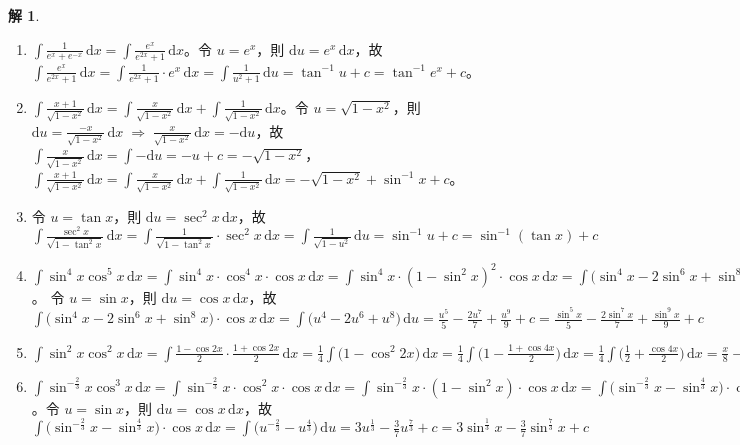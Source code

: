 \documentclass[12pt]{extarticle}
\newcommand{\ds}{\displaystyle}
\newcommand{\ie}{\;\Longrightarrow\;}
\theoremstyle{definition}
\newtheorem*{sol}{解}
\begin{document}
\begin{sol}
\begin{enumerate}
    \item $\ds\int\!\frac{1}{e^x + e^{-x}}\,\mathrm{d}x = \int\!\frac{e^x}{e^{2x} + 1}\,\text{d}x$。令 $\ds u = e^x$，則 $\ds\text{d}u = e^x\,\text{d}x$，故 $\ds\int\!\frac{e^x}{e^{2x} + 1}\,\text{d}x = \int\!\frac{1}{e^{2x} + 1}\cdot e^x\,\text{d}x = \int\!\frac{1}{u^2 + 1}\,\text{d}u = \tan^{-1}u + c = \tan^{-1}{e^{x}} + c$。
    \item $\ds\int\!\frac{x + 1}{\sqrt{1 - x^2}}\,\text{d}x = \int\!\frac{x}{\sqrt{1 - x^2}}\,\text{d}x + \int\!\frac{1}{\sqrt{1 - x^2}}\,\text{d}x$。令 $\ds u = \sqrt{1 - x^2}$，則 $\ds\text{d}u = \frac{-x}{\sqrt{1 - x^2}}\,\text{d}x\ie \frac{x}{\sqrt{1 - x^2}}\,\text{d}x = -\text{d}u$，故 $\ds\int\!\frac{x}{\sqrt{1 - x^2}}\,\text{d}x = \int-\text{d}u = -u + c = -\sqrt{1 - x^2}$，$\ds\int\!\frac{x + 1}{\sqrt{1 - x^2}}\,\text{d}x = \int\!\frac{x}{\sqrt{1 - x^2}}\,\text{d}x + \int\!\frac{1}{\sqrt{1 - x^2}}\,\text{d}x = -\sqrt{1 - x^2} + \sin^{-1}x + c$。
    \item 令 $\ds u = \tan x$，則 $\ds\text{d}u = \sec^2 x\,\text{d}x$，故 $\ds\int\!\frac{\sec^2 x}{\sqrt{1 - \tan^2 x}}\,\mathrm{d}x = \int\!\frac{1}{\sqrt{1 - \tan^2 x}}\cdot \sec^2 x\,\text{d}x = \int\!\frac{1}{\sqrt{1 - u^2}}\,\text{d}u = \sin^{-1} u + c = \sin^{-1}(\tan{x}) + c $
    \item $\ds\int\!\sin^4 x\cos^5 x\,\mathrm{d}x = \int\!\sin^4 x\cdot\cos^4 x\cdot\cos x\,\text{d}x = \int\!\sin^4x\cdot(1 - \sin^2 x)^2\cdot\cos x\,\text{d}x = \int\!\big(\sin^4x  - 2\sin^6x + \sin^8x\big)\cdot\cos x\,\text{d}x$。 令 $\ds u = \sin x$，則 $\ds\text{d}u = \cos x\,\text{d}x$，故 $\ds\int\!\big(\sin^4x  - 2\sin^6x + \sin^8x\big)\cdot\cos x\,\text{d}x = \int\!\big(u^4 - 2u^6 + u^8\big)\,\text{d}u = \frac{u^5}{5} - \frac{2u^7}{7} + \frac{u^9}{9} + c = \frac{\sin^5 x}{5} - \frac{2\sin^7 x}{7} + \frac{\sin^9 x}{9} + c$
    \item $\ds\int\!\sin^2 x\cos^2 x\,\mathrm{d}x = \int\!\frac{1 - \cos 2x}{2}\cdot\frac{1 + \cos 2x}{2}\,\text{d}x = \frac{1}{4}\int\!\big(1 - \cos^2{2x}\big)\,\text{d}x = \frac{1}{4}\int\!\big(1 - \frac{1 + \cos 4x}{2}\big)\,\text{d}x = \frac{1}{4}\int\!\big(\frac{1}{2} + \frac{\cos 4x}{2}\big)\,\text{d}x = \frac{x}{8} - \frac{\sin 4x}{32} + c$
    \item $\ds\int\!\sin^{-\frac{2}{3}} x\cos^3 x\,\mathrm{d}x = \int\!\sin^{-\frac{2}{3}} x\cdot\cos^2 x\cdot\cos x\,\mathrm{d}x = \int\!\sin^{-\frac{2}{3}} x\cdot(1 - \sin^2 x)\cdot\cos x\,\mathrm{d}x = \int\!\big(\sin^{-\frac{2}{3}} x - \sin^{\frac{4}{3}} x\big)\cdot\cos x\,\mathrm{d}x$。令 $u = \sin x$，則 $\ds\text{d}u = \cos x\,\text{d}x$，故 $\ds\int\!\big(\sin^{-\frac{2}{3}} x - \sin^{\frac{4}{3}} x\big)\cdot\cos x\,\mathrm{d}x = \int\!\big(u^{-\frac{2}{3}} - u^{\frac{4}{3}}\big)\,\text{d}u = 3u^{\frac{1}{3}} - \frac{3}{7}u^{\frac{7}{3}} + c = 3\sin^{\frac{1}{3}}x - \frac{3}{7}\sin^{\frac{7}{3}}x + c$

\end{enumerate}
\end{sol}
\end{document}
